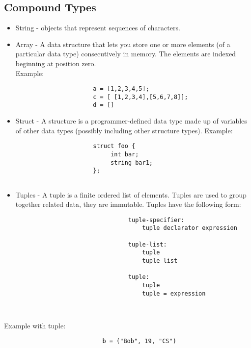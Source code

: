 \documentclass[./LRM_main.tex]{subfiles}
\begin{document}
\subsection{Compound Types}
\begin{itemize}
    \item String - objects that represent sequences of characters. 
    \item Array - A data structure that lets you store one or more elements (of a particular data type) consecutively in memory. The elements are indexed beginning at position zero. 
    \\Example:

\begin{lstlisting}
                      a = [1,2,3,4,5];
		              c = [ [1,2,3,4],[5,6,7,8]];
		              d = []
\end{lstlisting}
    \item Struct - A structure is a programmer-defined data type made up of variables of other data types (possibly including other structure types). 
 Example:
        \begin{lstlisting}		              
		              struct foo {
			               int bar;
			               string bar1;
                      };
		      

\end{lstlisting}
        

    \item Tuples - A tuple is a finite ordered list of elements. Tuples are used to group together related data, they are immutable. Tuples have the following form:
    \begin{lstlisting}
                                tuple-specifier:
                                    tuple declarator expression
                                    
                                tuple-list:
                                    tuple
                                    tuple-list
                                    
                                tuple:
                                    tuple
                                    tuple = expression
                                    
                                    
    \end{lstlisting}
    
\end{itemize}

Example with tuple:
\begin{lstlisting}
                            b = ("Bob", 19, "CS")
\end{lstlisting}
\end{document}
